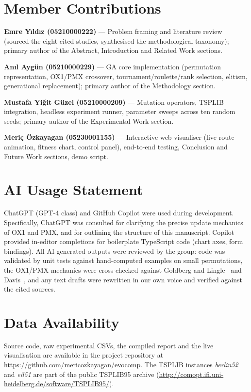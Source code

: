 \documentclass[conference]{IEEEtran}
\begin{document}
\section*{Member Contributions}

\textbf{Emre Y{\i}ld{\i}z (05210000222)} — Problem framing and literature
review (sourced the eight cited studies, synthesised the methodological
taxonomy); primary author of the Abstract, Introduction and Related Work
sections.\par
\textbf{An{\i}l Ayg{\"u}n (05210000229)} — GA core implementation
(permutation representation, OX1/PMX crossover, tournament/roulette/rank
selection, elitism, generational replacement); primary author of the
Methodology section.\par
\textbf{Mustafa Yi{\u g}it G{\"u}zel (05210000209)} — Mutation operators,
TSPLIB integration, headless experiment runner, parameter sweeps across
ten random seeds; primary author of the Experimental Work section.\par
\textbf{Meri{\c c} {\"O}zkayagan (05230001155)} — Interactive web
visualiser (live route animation, fitness chart, control panel),
end-to-end testing, Conclusion and Future Work sections, demo
script.\par

\section*{AI Usage Statement}

ChatGPT (GPT-4 class) and GitHub Copilot were used during development.
Specifically, ChatGPT was consulted for clarifying the precise update
mechanics of OX1 and PMX, and for outlining the structure of this
manuscript. Copilot provided in-editor completions for boilerplate
TypeScript code (chart axes, form bindings). All AI-generated outputs
were reviewed by the group: code was validated by unit tests against
hand-computed examples on small permutations, the OX1/PMX mechanics were
cross-checked against Goldberg and Lingle~\cite{goldberg1985} and
Davis~\cite{davis1985}, and any text drafts were rewritten in our own
voice and verified against the cited sources.

\section*{Data Availability}

Source code, raw experimental CSVs, the compiled report and the live
visualisation are available in the project repository at
\url{https://github.com/mericozkayagan/evocomp}. The TSPLIB instances
\textit{berlin52} and \textit{eil51} are part of the public
TSPLIB95 archive (\url{http://comopt.ifi.uni-heidelberg.de/software/TSPLIB95/}).
\end{document}
